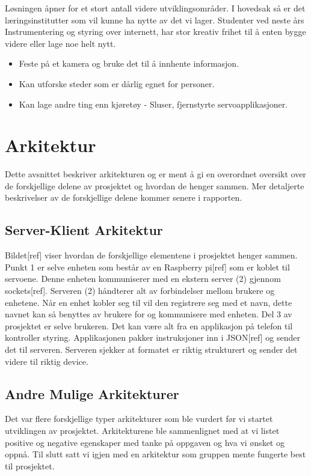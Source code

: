 \documentclass[12pt]{report}
\begin{document}
Løsningen åpner for et stort antall videre utviklingsområder. I hovedsak så er det læringsinstitutter som vil kunne ha nytte av det vi lager. Studenter ved neste års Instrumentering og styring over internett, har stor kreativ frihet til å enten bygge videre eller lage noe helt nytt. 

\begin{itemize}
	\item Feste på et kamera og bruke det til å innhente informasjon.
	\item Kan utforske steder som er dårlig egnet for personer.
	\item Kan lage andre ting enn kjøretøy - Sluser, fjernstyrte servoapplikasjoner.
\end{itemize}

\clearpage

\chapter{Arkitektur}
Dette avsnittet beskriver arkitekturen og er ment å gi en overordnet oversikt over de forskjellige delene av prosjektet og hvordan de henger sammen. Mer detaljerte beskrivelser av de forskjellige delene kommer senere i rapporten.

\section{Server-Klient Arkitektur}
Bildet[ref] viser hvordan de forskjellige elementene i prosjektet henger sammen. Punkt 1 er selve enheten som består av en Raspberry pi[ref] som er koblet til servoene. Denne enheten kommuniserer med en ekstern server (2) gjennom sockets[ref]. Serveren (2) håndterer alt av forbindelser mellom brukere og enhetene. Når en enhet kobler seg til vil den registrere seg med et navn, dette navnet kan så benyttes av brukere for og kommunisere med enheten. Del 3 av prosjektet er selve brukeren. Det kan være alt fra en applikasjon på telefon til kontroller styring. Applikasjonen pakker instruksjoner inn i JSON[ref] og sender det til serveren. Serveren sjekker at formatet er riktig strukturert og sender det videre til riktig device.

\section{Andre Mulige Arkitekturer}
Det var flere forskjellige typer arkitekturer som ble vurdert før vi startet utviklingen av prosjektet. Arkitekturene ble sammenlignet med at vi listet positive og negative egenskaper med tanke på oppgaven og hva vi ønsket og oppnå. Til slutt satt vi igjen med en arkitektur som gruppen mente fungerte best til prosjektet.
\end{document}
